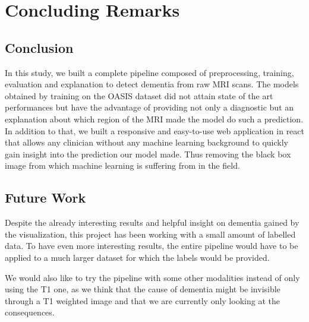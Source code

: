 \chapter{Concluding Remarks}

\section{Conclusion}
In this study, we built a complete pipeline composed of preprocessing, training, evaluation and explanation to detect dementia from raw MRI scans. The models obtained by training on the OASIS dataset did not attain state of the art performances but have the advantage of providing not only a diagnostic but an explanation about which region of the MRI made the model do such a prediction. In addition to that, we built a responsive and easy-to-use web application in react\footnotemark{} that allows any clinician without any machine learning background to quickly gain insight into the prediction our model made. Thus removing the black box image from which machine learning is suffering from in the field.  

\section{Future Work}
Despite the already interesting results and helpful insight on dementia gained by the visualization, this project has been working with a small amount of labelled data. To have even more interesting results, the entire pipeline would have to be applied to a much larger dataset for which the labels would be provided.

We would also like to try the pipeline with some other modalities instead of only using the T1 one, as we think that the cause of dementia might be invisible through a T1 weighted image and that we are currently only looking at the consequences.